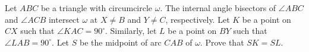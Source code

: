 Let $ABC$ be a triangle with circumcircle $\omega$. The internal angle bisectors of $\angle ABC$ and $\angle ACB$ intersect $\omega$ at $X\neq B$ and $Y\neq C$, respectively. Let $K$ be a point on $CX$ such that $\angle KAC = 90^\circ$. Similarly, let $L$ be a point on $BY$ such that $\angle LAB = 90^\circ$. Let $S$ be the midpoint of arc $CAB$ of $\omega$. Prove that $SK=SL$.